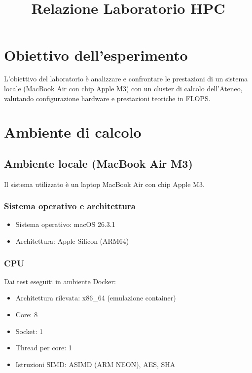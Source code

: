\documentclass[a4paper,12pt]{article}
\title{Relazione Laboratorio HPC}
\author{}
\date{}
\begin{document}
\maketitle

\section{Obiettivo dell’esperimento}

L’obiettivo del laboratorio è analizzare e confrontare le prestazioni di un sistema locale (MacBook Air con chip Apple M3) con un cluster di calcolo dell’Ateneo, valutando configurazione hardware e prestazioni teoriche in FLOPS.

\section{Ambiente di calcolo}

\subsection{Ambiente locale (MacBook Air M3)}

Il sistema utilizzato è un laptop MacBook Air con chip Apple M3.

\subsubsection{Sistema operativo e architettura}

\begin{itemize}
    \item Sistema operativo: macOS 26.3.1
    \item Architettura: Apple Silicon (ARM64)
\end{itemize}

\subsubsection{CPU}

Dai test eseguiti in ambiente Docker:

\begin{itemize}
    \item Architettura rilevata: x86\_64 (emulazione container)
    \item Core: 8
    \item Socket: 1
    \item Thread per core: 1
    \item Istruzioni SIMD: ASIMD (ARM NEON), AES, SHA
\end{itemize}
\end{document}
